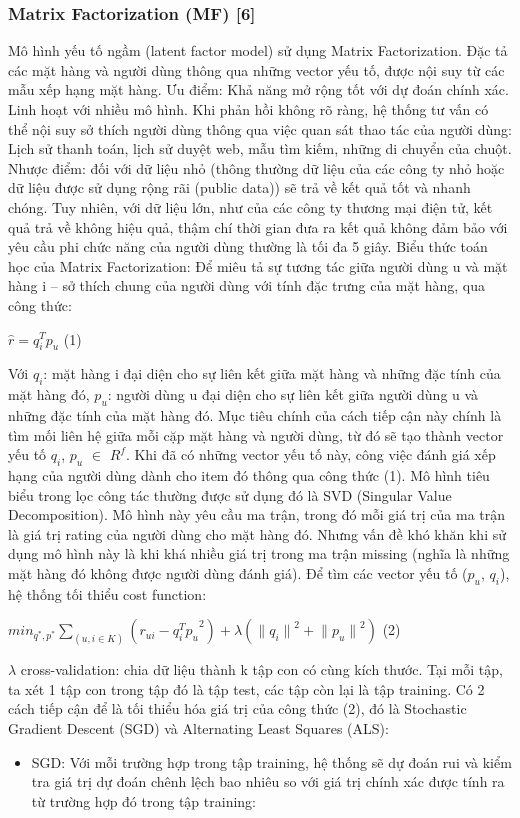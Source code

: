 \documentclass[a4paper,12pt,numbered,print,index,custombib, oneside, custommargin]{report}
\begin{document}
\subsubsection{Matrix Factorization (MF) [6]}
Mô hình yếu tố ngầm (latent factor model) sử dụng Matrix Factorization.
Đặc tả các mặt hàng và người dùng thông qua những vector yếu tố, được nội suy từ các mẫu xếp hạng mặt hàng.
Ưu điểm: Khả năng mở rộng tốt với dự đoán chính xác. Linh hoạt với nhiều mô hình.
Khi phản hồi không rõ ràng, hệ thống tư vấn có thể nội suy sở thích người dùng thông qua việc quan sát thao tác của người dùng: Lịch sử thanh toán, lịch sử duyệt web, mẫu tìm kiếm, những di chuyển của chuột.
Nhược điểm: đối với dữ liệu nhỏ (thông thường dữ liệu của các công ty nhỏ hoặc dữ liệu được sử dụng rộng rãi (public data)) sẽ trả về kết quả tốt và nhanh chóng. Tuy nhiên, với dữ liệu lớn, như của các công ty thương mại điện tử, kết quả trả về không hiệu quả, thậm chí thời gian đưa ra kết quả không đảm bảo với yêu cầu phi chức năng của người dùng thường là tối đa 5 giây.
Biểu thức toán học của Matrix Factorization:
Để miêu tả sự tương tác giữa người dùng u và mặt hàng i – sở thích chung của người dùng với tính đặc trưng của mặt hàng, qua công thức:	\par
$\hat{r} = q_i^T p_u$	(1)

Với $q_i$: mặt hàng i đại diện cho sự liên kết giữa mặt hàng và những đặc tính của mặt hàng đó, $p_u$: người dùng u đại diện cho sự liên kết giữa người dùng u và những đặc tính của mặt hàng đó.
Mục tiêu chính của cách tiếp cận này chính là tìm mối liên hệ giữa mỗi cặp mặt hàng và người dùng, từ đó sẽ tạo thành vector yếu tố $q_i$, $p_u$ $\in$ $R^f$. Khi đã có những vector yếu tố này, công việc đánh giá xếp hạng của người dùng dành cho item đó thông qua công thức (1).
Mô hình tiêu biểu trong lọc công tác thường được sử dụng đó là SVD (Singular Value Decomposition). Mô hình này yêu cầu ma trận, trong đó mỗi giá trị của ma trận là giá trị rating của người dùng cho mặt hàng đó. Nhưng vấn đề khó khăn khi sử dụng mô hình này là khi khá nhiều giá trị trong ma trận missing (nghĩa là những mặt hàng đó không được người dùng đánh giá).  
Để tìm các vector yếu tố ($p_u$, $q_i$), hệ thống tối thiểu cost function:		\par

$min_{q^*, p^*} \sum_{(u,i \in K)} ({r_{ui} - q_i^T p_u}^2) + \lambda ({{\parallel q_i \parallel}^2 + {\parallel p_u \parallel}^2}) $  (2)\par

$\lambda$ cross-validation: chia dữ liệu thành k tập con có cùng kích thước. Tại mỗi tập, ta xét 1 tập con trong tập đó là tập test, các tập còn lại là tập training.
Có 2 cách tiếp cận để là tối thiểu hóa giá trị của công thức (2), đó là Stochastic Gradient Descent (SGD) và Alternating Least Squares (ALS):
\begin{itemize}
\item SGD: Với mỗi trường hợp trong tập training, hệ thống sẽ dự đoán rui và kiểm tra giá trị dự đoán chênh lệch bao nhiêu so với giá trị chính xác được tính ra từ trường hợp đó trong tập training:
\end{itemize} \par
\end{document}
